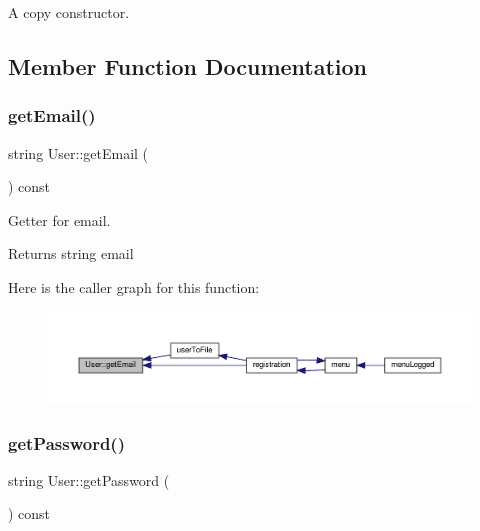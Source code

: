 A copy constructor. 

\subsection{Member Function Documentation}
\mbox{\label{class_user_a4c647e583bd964f40f687776a0d185dc}} 
\subsubsection{\texorpdfstring{get\+Email()}{getEmail()}}
{\footnotesize\ttfamily string User\+::get\+Email (\begin{DoxyParamCaption}{ }\end{DoxyParamCaption}) const\hspace{0.3cm}{\ttfamily [inline]}}

Getter for email. \begin{DoxyReturn}{Returns}
string email 
\end{DoxyReturn}
Here is the caller graph for this function\+:\nopagebreak
\begin{figure}[H]
\begin{center}
\leavevmode
\includegraphics[width=350pt]{class_user_a4c647e583bd964f40f687776a0d185dc_icgraph}
\end{center}
\end{figure}
\mbox{\label{class_user_a33429bdd1253091697a9c5c5e1448bee}} 
\subsubsection{\texorpdfstring{get\+Password()}{getPassword()}}
{\footnotesize\ttfamily string User\+::get\+Password (\begin{DoxyParamCaption}{ }\end{DoxyParamCaption}) const\hspace{0.3cm}{\ttfamily [inline]}}

